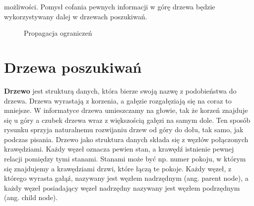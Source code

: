 możliwości. Pomysł cofania pewnych informacji w górę drzewa będzie wykorzystywany dalej w drzewach poszukiwań.

\clearpage
\begin{figure}[H]
\centering

\caption{Propagacja ograniczeń}
\end{figure}
\clearpage

\section{Drzewa poszukiwań}

\textbf{Drzewo} jest strukturą danych, która bierze swoją nazwę z podobieństwa do drzewa. Drzewa wyrastają z korzenia, a gałęzie rozgałęziają się na coraz to mniejsze. W informatyce drzewa umieszczamy na głowie, tak że korzeń znajduje się u góry a czubek drzewa wraz z większością gałęzi na samym dole. Ten sposób rysunku sprzyja naturalnemu rozwijaniu drzew od góry do dołu, tak samo, jak podczas pisania. Drzewo jako struktura danych składa się z węzłów połączonych krawędziami. Każdy węzeł oznacza pewien stan, a krawędź istnienie pewnej relacji pomiędzy tymi stanami. Stanami może być np. numer pokoju, w którym się znajdujemy a krawędziami drzwi, które łączą te pokoje. Każdy węzeł, z którego wyrasta gałąź, nazywany jest węzłem nadrzędnym (ang. parent node), a każdy węzeł posiadający węzeł nadrzędny nazywany jest węzłem podrzędnym (ang. child node).\newline

